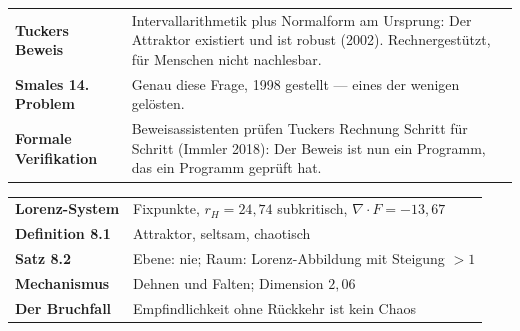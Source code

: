 \begin{forschung}
\begin{center}
{\small
\renewcommand{\arraystretch}{1.45}
\begin{tabular}{@{}P{3.0cm}P{5.2cm}@{}}
\toprule
\textbf{Tuckers Beweis} & Intervallarithmetik plus Normalform am Ursprung: Der Attraktor existiert und ist robust (2002). Rechnergestützt, für Menschen nicht nachlesbar.\\
\textbf{Smales 14. Problem} & Genau diese Frage, 1998 gestellt --- eines der wenigen gelösten.\\
\textbf{Formale Verifikation} & Beweisassistenten prüfen Tuckers Rechnung Schritt für Schritt (Immler 2018): Der Beweis ist nun ein Programm, das ein Programm geprüft hat.\\
\bottomrule
\end{tabular}}
\end{center}

\begin{center}
\begin{minipage}{0.88\textwidth}
\end{minipage}
\end{center}
\end{forschung}

\begin{merksatz}
\begin{center}
\renewcommand{\arraystretch}{1.5}
\begin{tabular}{@{}P{3.0cm}P{5.6cm}@{}}
\toprule
\textbf{Lorenz-System} & Fixpunkte, $r_H = 24{,}74$ subkritisch, $\nabla\cdot F = -13{,}67$\\
\textbf{Definition 8.1} & Attraktor, seltsam, chaotisch\\
\textbf{Satz 8.2} & Ebene: nie; Raum: Lorenz-Abbildung mit Steigung $> 1$\\
\textbf{Mechanismus} & Dehnen und Falten; Dimension $2{,}06$\\
\textbf{Der Bruchfall} & Empfindlichkeit ohne Rückkehr ist kein Chaos\\
\bottomrule
\end{tabular}
\end{center}

\begin{center}
\begin{minipage}{0.88\textwidth}
\end{minipage}
\end{center}
\end{merksatz}
